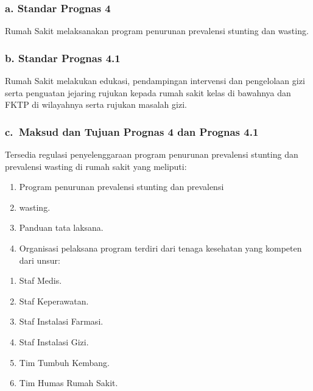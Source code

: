 \documentclass[
]{book}
\providecommand{\tightlist}{%
  \setlength{\itemsep}{0pt}\setlength{\parskip}{0pt}}
\begin{document}
\hypertarget{a.-standar-prognas-4}{%
\subsubsection*{a. Standar Prognas 4}\label{a.-standar-prognas-4}}

Rumah Sakit melaksanakan program penurunan prevalensi
stunting dan wasting.

\hypertarget{b.-standar-prognas-4.1}{%
\subsubsection*{b. Standar Prognas 4.1}\label{b.-standar-prognas-4.1}}

Rumah Sakit melakukan edukasi, pendampingan intervensi dan pengelolaan gizi serta penguatan jejaring rujukan kepada rumah sakit kelas di bawahnya dan FKTP di wilayahnya serta rujukan masalah gizi.

\hypertarget{c.-maksud-dan-tujuan-prognas-4-dan-prognas-4.1}{%
\subsubsection*{c.~Maksud dan Tujuan Prognas 4 dan Prognas 4.1}\label{c.-maksud-dan-tujuan-prognas-4-dan-prognas-4.1}}

Tersedia regulasi penyelenggaraan program penurunan prevalensi stunting dan prevalensi wasting di rumah sakit yang meliputi:

\begin{enumerate}
\def\labelenumi{\arabic{enumi}.}
\tightlist
\item
  Program penurunan prevalensi stunting dan prevalensi
\item
  wasting.
\item
  Panduan tata laksana.
\item
  Organisasi pelaksana program terdiri dari tenaga kesehatan yang kompeten dari unsur:
\end{enumerate}

\begin{enumerate}
\def\labelenumi{\alph{enumi}.}
\tightlist
\item
  Staf Medis.
\item
  Staf Keperawatan.
\item
  Staf Instalasi Farmasi.
\item
  Staf Instalasi Gizi.
\item
  Tim Tumbuh Kembang.
\item
  Tim Humas Rumah Sakit.
\end{enumerate}
\end{document}
